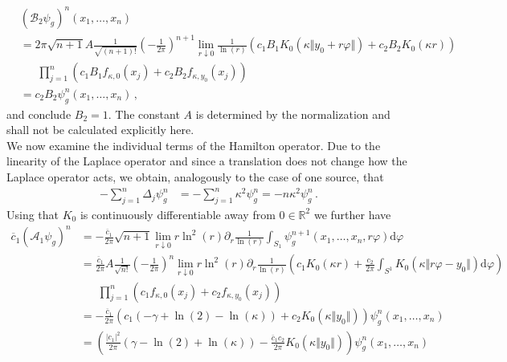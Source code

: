 \begin{align*}
  &
  (\mathcal{B}_{2}\psi_{g})^{n}
  \left(
    x_{1}
    ,
    \dots
    ,
    x_{n}
  \right)
  \\
  &=
  2\pi
  \sqrt{n + 1}
  A
  \frac{1}{\sqrt{(n + 1)!}}
  \left(
    -
    \frac{1}{2\pi}
  \right)^{n + 1}
  \lim_{r \downarrow 0}
  \frac{1}{\ln(r)}
  \left(
    c_{1}
    B_{1}
    K_{0}
    \left(
      \kappa
      \Vert y_{0} + r\varphi \Vert
    \right)
    +
    c_{2}
    B_{2}
    K_{0}(\kappa r)
  \right)
  \\
  &\phantom{=\ }
  \prod_{j = 1}^{n}
  \left(
    c_{1}
    B_{1}
    f_{\kappa,0}(x_{j})
    +
    c_{2}
    B_{2}
    f_{\kappa,y_{0}}(x_{j})
  \right)
  \\
  &=
  c_{2}
  B_{2}
  \psi_{g}^{n}
  \left(
    x_{1}
    ,
    \dots
    ,
    x_{n}
  \right)
  \,,
\end{align*}
and conclude $B_{2} = 1$. The constant $A$ is determined by the normalization and shall not be calculated explicitly here.
\\
We now examine the individual terms of the Hamilton operator. Due to the linearity of the Laplace operator and since a translation does not change how the Laplace operator acts, we obtain, analogously to the case of one source, that
\begin{align*}
  -
  \sum_{j = 1}^{n}
  \Delta_{j}
  \psi_{g}^{n}
  &=
  -
  \sum_{j = 1}^{n}
  \kappa^{2}
  \psi_{g}^{n}
  =
  -
  n
  \kappa^{2}
  \psi_{g}^{n}
  \,.
\end{align*}
Using that $K_{0}$ is continuously differentiable away from $0 \in \mathbb{R}^{2}$ we further have
\begin{align*}
  \overline{c}_{1}
  (\mathcal{A}_{1}\psi_{g})^{n}
  &=
  -
  \frac{\overline{c}_{1}}{2\pi}
  \sqrt{n + 1}
  \lim_{r \downarrow 0}
  r\ln^{2}(r)
  \partial_{r}
  \frac{1}{\ln(r)}
  \int_{S_{1}}
  \psi_{g}^{n + 1}
  \left(
    x_{1}
    ,
    \dots
    ,
    x_{n}
    ,
    r\varphi
  \right)
  \mathrm{d}\varphi
  \\
  &=
  \frac{\overline{c}_{1}}{2\pi}
  A
  \frac{1}{\sqrt{n!}}
  \left(
    -
    \frac{1}{2\pi}
  \right)^{n}
  \lim_{r \downarrow 0}
  r\ln^{2}(r)
  \partial_{r}
  \frac{1}{\ln(r)}
  \left(
    c_{1}
    K_{0}(\kappa r)
    +
    \frac{c_{2}}{2\pi}
    \int_{S^{1}}
    K_{0}
    \left(
      \kappa
      \Vert r\varphi - y_{0} \Vert
    \right)
    \mathrm{d}\varphi
  \right)
  \\
  &\phantom{=\ }
  \prod_{j = 1}^{n}
  \left(
    c_{1}
    f_{\kappa,0}(x_{j})
    +
    c_{2}
    f_{\kappa,y_{0}}(x_{j})
  \right)
  \\
  &=
  -
  \frac{\overline{c}_{1}}{2\pi}
  \left(
    c_{1}
    \left(
      -
      \gamma
      +
      \ln(2)
      -
      \ln(\kappa)
    \right)
    +
    c_{2}
    K_{0}(\kappa\Vert y_{0} \Vert)
  \right)
  \psi_{g}^{n}
  \left(
    x_{1}
    ,
    \dots
    ,
    x_{n}
  \right)
  \\
  &=
  \left(
    \frac{\vert c_{1} \vert^{2}}{2\pi}
    \left(
      \gamma
      -
      \ln(2)
      +
      \ln(\kappa)
    \right)
    -
    \frac{\overline{c}_{1}c_{2}}{2\pi}
    K_{0}(\kappa\Vert y_{0} \Vert)
  \right)
  \psi_{g}^{n}
  \left(
    x_{1}
    ,
    \dots
    ,
    x_{n}
  \right)
\end{align*}
